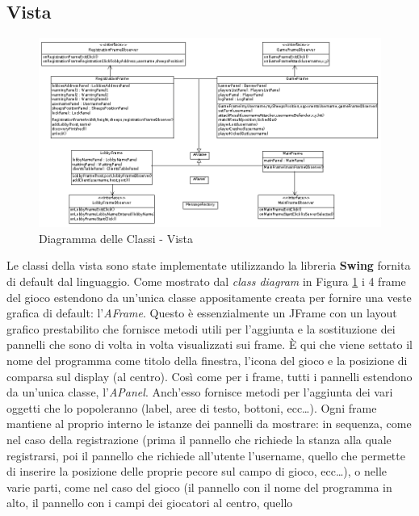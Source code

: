 \subsection{Vista}
\begin{figure}[!h]
	\centering
	\includegraphics[scale=0.4, angle=90]{core/imgs/uml/vista}
	\caption{Diagramma delle Classi - Vista}
	\label{figure:class_diagram_view}
\end{figure}
Le classi della vista sono state implementate utilizzando la libreria
\textbf{Swing} fornita di default dal linguaggio.\newline
Come mostrato dal \textit{class diagram} in Figura
\ref{figure:class_diagram_view} i 4 frame del gioco estendono da un'unica
classe appositamente creata per fornire una veste grafica di default:
l'\textit{AFrame}. Questo è essenzialmente un JFrame con un layout grafico
prestabilito che fornisce metodi utili per l'aggiunta e la sostituzione dei
pannelli che sono di volta in volta visualizzati sui frame. È qui che viene
settato il nome del programma come titolo della finestra, l'icona del gioco e la
posizione di comparsa sul display (al centro).\newline
Così come per i frame, tutti i pannelli estendono da un'unica classe,
l'\textit{APanel}. Anch'esso fornisce metodi per l'aggiunta dei vari oggetti che
lo popoleranno (label, aree di testo, bottoni, ecc\dots). Ogni frame mantiene al
proprio interno le istanze dei pannelli da mostrare: in sequenza, come nel caso
della registrazione (prima il pannello che richiede la stanza alla quale
registrarsi, poi il pannello che richiede all'utente l'username, quello che
permette di inserire la posizione delle proprie pecore sul campo di gioco,
ecc\dots), o nelle varie parti, come nel caso del gioco (il pannello con il nome
del programma in alto, il pannello con i campi dei giocatori al centro, quello
